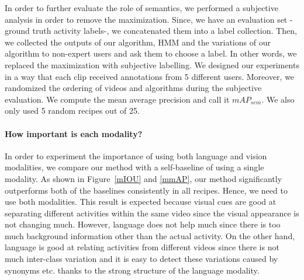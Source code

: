 In order to further evaluate the role of semantics, we performed a subjective analysis in order to remove the maximization. Since, we have an evaluation set -ground truth activity labels-, we concatenated them into a label collection. Then, we collected the outputs of our algorithm, HMM and the variations of our algorithm to non-expert users and ask them to choose a label. In other words, we replaced the maximization with subjective labelling. We designed our experiments in a way that each clip received annotations from 5 different users. Moreover, we randomized the ordering of videos and algorithms during the subjective evaluation. We compute the mean average precision and call it $mAP_{sem}$. We also only used 5 random recipes out of 25.

\begin{table}
\caption{Semantic mean-average-precision $mAP_{sem}$ computed based on subjective evaluation.}
{\small
{}}
\normalsize
\end{table}


\paragraph{How important is each modality?}
In order to experiment the importance of using both language and vision modalities, we compare our method with a self-baseline of using a single modality. As shown in Figure~\ref{mIOU} and \ref{mmAP}, our method significantly outperforms both of the baselines consistently in all recipes. Hence, we need to use both modalities. This result is expected because visual cues are good at separating different activities within the same video since the visual appearance is not changing much. However, language does not help much since there is too much background information other than the actual activity. On the other hand, language is good at relating activities from different videos since there is not much inter-class variation and it is easy to detect these variations caused by synonyms etc. thanks to the strong structure of the language modality.
